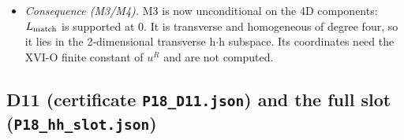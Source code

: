 \begin{itemize}
  pair in the $\varepsilon$-scalar directions. Their status is not\_applicable\_not\_verified, because XVI-O is
  strictly 4D and has no counterpart. The evanescent structures of D11 have nonzero
  $L$-coefficients (8, recorded); they are $\varepsilon$-scalar components outside the 4D statement.
\item \emph{Consequence (M3/M4).} M3 is now unconditional on the 4D components: $L_{\rm match}$ is supported at 0. It is transverse and homogeneous of degree four,
  so it lies in the 2-dimensional transverse h$\cdot$h subspace. Its coordinates need the XVI-O finite constant of
  $u^R$ and are not computed.
\end{itemize}

\subsection{D11 (certificate \texttt{P18\_D11.json}) and the full slot (\texttt{P18\_hh\_slot.json})}
